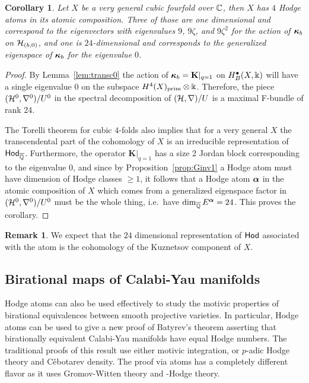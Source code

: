 \documentclass[twoside,leqno]{article}
\numberwithin{equation}{section}
\theoremstyle{plain}
\newtheorem{corollary}[equation]{Corollary}
\theoremstyle{definition}
\newtheorem{remark}[equation]{Remark}
\begin{document}
\begin{corollary} \label{cor:atomscubic4}
Let $X$ be a very general cubic fourfold over $\mathbb C$, then $X$ has $4$ Hodge atoms in its atomic composition. Three of those are one dimensional and correspond to the eigenvectors with eigenvalues  $9$, $9\zeta$, and $9\zeta^2$ for the action of $\boldsymbol{\kappa}_{b}$ on $\mathcal H_{(b,0)}$,
and one is $24$-dimensional and corresponds to the generalized eigenspace of 
$\boldsymbol{\kappa}_{b}$ for the eigenvalue $0$. 
\end{corollary}
\begin{proof} 
By Lemma~\ref{lem:transc0} the action 
of $\boldsymbol{\kappa}_{b} = \mathbf{K}|_{q=1}$ on $H^{\bullet}_{B}(X,\Bbbk)$ will have a single eigenvalue $0$ on the subspace $H^4(X)_{\text{prim}}\otimes \Bbbk$. Therefore, the piece 
$(\mathcal H^0,\nabla^0)/U^0$ in the spectral decomposition of $(\mathcal H,\nabla)/U$ is a maximal F-bundle of rank $24$.

The Torelli theorem \cite{Voisin-cubicTorelli,Looijenga-cubicTorelli,Charles-cubicTorelli} for cubic $4$-folds also implies that for a very general $X$ the transcendental part of the cohomology of $X$ is an irreducible representation of $\mathsf{Hod}_{\overline{\mathbb Q}}$. Furthermore, the operator $\mathbf{K}|_{q=1}$ has a size 2 Jordan block corresponding to the eigenvalue $0$, and 
since by Proposition~\ref{prop:Ginv1} a Hodge atom must have dimension of Hodge classes $\geq 1$, it follows that  a Hodge atom $\boldsymbol{\alpha}$ in the atomic composition of $X$
which comes from a generalized eigenspace factor in $(\mathcal H^0,\nabla^0)/U^0$ must  be the whole thing, i.e.\ have $\dim_{\overline{\mathbb Q}} E^{\boldsymbol{\alpha}} = 24$. This proves the corollary.
\end{proof}


\begin{remark} \label{rem:Kuznetsov} We expect that the $24$ dimensional representation of $\mathsf{Hod}$ associated with the atom 
is the cohomology of the Kuznetsov component \cite{Kuznetsov-cubic4fold} of $X$. 
\end{remark}







\subsection{Birational maps of Calabi-Yau manifolds} \label{ssec:birCY}

Hodge atoms  can also be used effectively to study the motivic properties of birational equivalences between smooth projective varieties. In particular, Hodge atoms can be used to give a new proof of Batyrev's theorem \cite[Corollary~6.29]{Batyrev-StringyHodge} asserting that birationally equivalent Calabi-Yau manifolds have equal Hodge numbers. The traditional proofs of this result \cite{Batyrev-StringyHodge,Wang-Kequivalence,Ito} use either motivic integration, or $p$-adic Hodge theory and C\v{e}botarev density. The proof via atoms has a completely different flavor as it uses Gromov-Witten theory and \nc-Hodge theory. 
\end{document}
